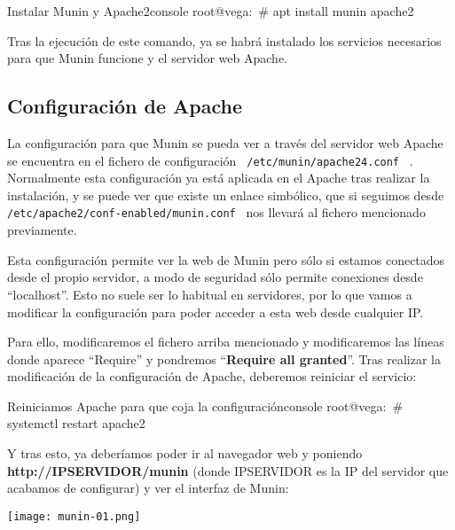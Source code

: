 \begin{mycode}{Instalar Munin y Apache2}{console}{}
root@vega:~# apt install munin apache2
\end{mycode}

Tras la ejecución de este comando, ya se habrá instalado los servicios necesarios para que Munin funcione y el servidor web Apache.

\subsection{Configuración de Apache}
La configuración para que Munin se pueda ver a través del servidor web Apache se encuentra en el fichero de configuración  \texttt{ /etc/munin/apache24.conf }  . Normalmente esta configuración ya está aplicada en el Apache tras realizar la instalación, y se puede ver que existe un enlace simbólico, que si seguimos desde  \texttt{ /etc/apache2/conf-enabled/munin.conf }  nos llevará al fichero mencionado previamente.

Esta configuración permite ver la web de Munin pero sólo si estamos conectados desde el propio servidor, a modo de seguridad sólo permite conexiones desde “localhost”. Esto no suele ser lo habitual en servidores, por lo que vamos a modificar la configuración para poder acceder a esta web desde cualquier IP.



Para ello, modificaremos el fichero arriba mencionado y modificaremos las líneas donde aparece “Require” y pondremos “\textbf{Require all granted}”. Tras realizar la modificación de la configuración de Apache, deberemos reiniciar el servicio:

\begin{mycode}{Reiniciamos Apache para que coja la configuración}{console}{}
root@vega:~# systemctl restart apache2
\end{mycode}

Y tras esto, ya deberíamos poder ir al navegador web y poniendo \textbf{http://IPSERVIDOR/munin} (donde IPSERVIDOR es la IP del servidor que acabamos de configurar) y ver el interfaz de Munin:

\begin{tcolorbox}[title=Interfaz de Munin]
    \centering
    \texttt{[image: munin-01.png]}
\end{tcolorbox}


